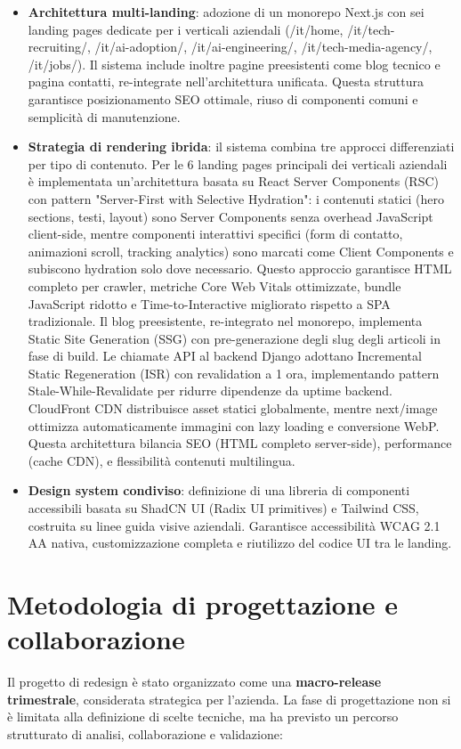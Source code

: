 \begin{itemize}
  \item \textbf{Architettura multi-landing}: adozione di un monorepo Next.js con sei landing pages dedicate per i verticali aziendali (/it/home, /it/tech-recruiting/, 
/it/ai-adoption/, /it/ai-engineering/, /it/tech-media-agency/, /it/jobs/). Il sistema 
include inoltre pagine preesistenti come blog tecnico e pagina contatti, 
re-integrate nell'architettura unificata. Questa struttura garantisce posizionamento 
SEO ottimale, riuso di componenti comuni e semplicità di manutenzione.
  
  \item \textbf{Strategia di rendering ibrida}: il sistema combina tre approcci 
differenziati per tipo di contenuto. Per le 6 landing pages principali dei 
verticali aziendali è implementata un'architettura basata su React Server 
Components (RSC) con pattern "Server-First with Selective Hydration": i contenuti 
statici (hero sections, testi, layout) sono Server Components senza overhead 
JavaScript client-side, mentre componenti interattivi specifici (form di contatto, 
animazioni scroll, tracking analytics) sono marcati come Client Components e 
subiscono hydration solo dove necessario. Questo approccio garantisce HTML 
completo per crawler, metriche Core Web Vitals ottimizzate, bundle JavaScript 
ridotto e Time-to-Interactive migliorato rispetto a SPA tradizionale.  Il blog preesistente, re-integrato nel 
monorepo, implementa Static Site Generation (SSG) con pre-generazione degli slug 
degli articoli in fase di build. Le chiamate API al backend Django adottano 
Incremental Static Regeneration (ISR) con revalidation a 1 ora, implementando 
pattern Stale-While-Revalidate per ridurre dipendenze da uptime backend. CloudFront 
CDN distribuisce asset statici globalmente, mentre next/image ottimizza 
automaticamente immagini con lazy loading e conversione WebP. Questa architettura 
bilancia SEO (HTML completo server-side), performance (cache CDN), e flessibilità 
contenuti multilingua.
  
  \item \textbf{Design system condiviso}: definizione di una libreria di componenti 
  accessibili basata su ShadCN UI (Radix UI primitives) e Tailwind CSS, costruita 
  su linee guida visive aziendali. Garantisce accessibilità WCAG 2.1 AA nativa, 
  customizzazione completa e riutilizzo del codice UI tra le landing.
\end{itemize}

\section{Metodologia di progettazione e collaborazione} 
Il progetto di redesign è stato organizzato come una \textbf{macro-release trimestrale},
considerata strategica per l'azienda. La fase di progettazione non si è limitata
alla definizione di scelte tecniche, ma ha previsto un percorso strutturato di
analisi, collaborazione e validazione:

